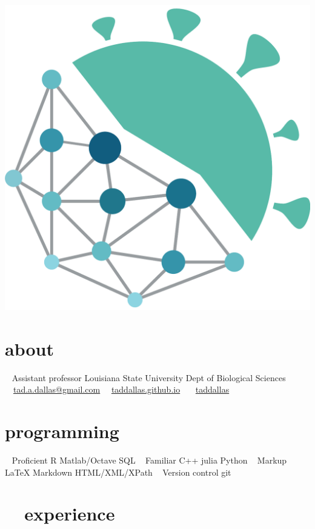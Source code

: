 \documentclass[]{CV}
\begin{document}


\begin{aside}
\vspace{-2cm}
\includegraphics[width=\textwidth]{dallasLab2.pdf}
  \section{about}
    ~
		Assistant professor
		Louisiana State University
		Dept of Biological Sciences
    ~
    \faEnvelope \ \  \href{mailto:tad.a.dallas@gmail.com}{tad.a.dallas@gmail.com}
    \faDesktop  \ \ \href{https://taddallas.github.io}{taddallas.github.io}
    \faGithub   \ \ \ \href{http://github.com/taddallas}{taddallas}
    ~
  \section{programming}
   ~
   {\mefont Proficient}
   R
   Matlab/Octave
   SQL
   ~
   {\mefont Familiar }
   C++
   julia
   Python
   ~
   {\mefont Markup}
   \LaTeX
   Markdown
   HTML/XML/XPath
   ~
   {\mefont Version control}
   git
\end{aside}





\section{\faFlask \ \ experience}
\end{document}

